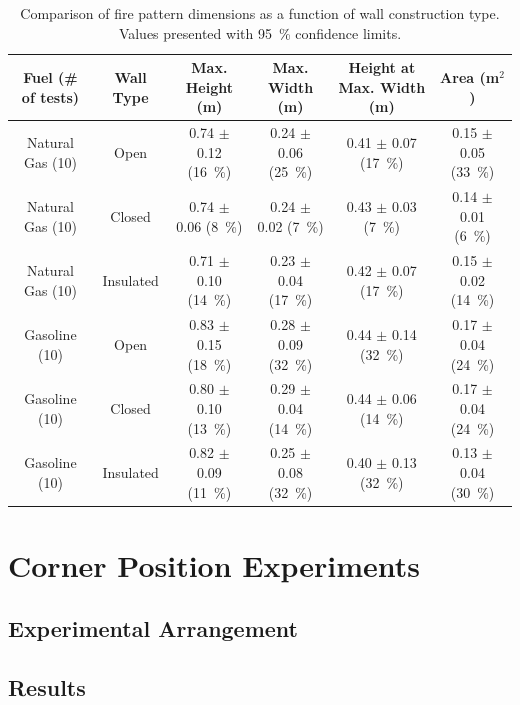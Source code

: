 \documentclass[twoside]{uocthesis}
\begin{document}
\begin{table}
	\centering
	\begin{tabular}{|c|c|c|c|c|c|}
	\hline
	Fuel (\# of tests)      &   Wall Type   &   Max. Height (m)	         & Max. Width (m)               &  Height at Max. Width (m) &  Area (m$^2$)  \\ \hline
		Natural Gas (10)    &   Open 		& 0.74 	$\pm$ 0.12 (16~\%)   &	0.24 $\pm$ 0.06 (25~\%) 	& 0.41 $\pm$ 0.07 (17~\%)	& 0.15 $\pm$ 0.05 (33~\%) 	\\
		Natural Gas (10)    &   Closed 		& 0.74	$\pm$ 0.06 (8~\%)    &	0.24 $\pm$ 0.02 (7~\%) 		& 0.43 $\pm$ 0.03 (7~\%)  	& 0.14 $\pm$ 0.01 (6~\%) 	\\
		Natural Gas (10)    &   Insulated 	& 0.71	$\pm$ 0.10 (14~\%)   &	0.23 $\pm$ 0.04 (17~\%) 	& 0.42 $\pm$ 0.07 (17~\%) 	& 0.15 $\pm$ 0.02 (14~\%)  	\\
		Gasoline (10)       &   Open    	& 0.83	$\pm$ 0.15 (18~\%)   &	0.28 $\pm$ 0.09 (32~\%) 	& 0.44 $\pm$ 0.14 (32~\%) 	& 0.17 $\pm$ 0.04 (24~\%)  	\\
		Gasoline (10)       &   Closed  	& 0.80	$\pm$ 0.10 (13~\%)   &	0.29 $\pm$ 0.04 (14~\%) 	& 0.44 $\pm$ 0.06 (14~\%) 	& 0.17 $\pm$ 0.04 (24~\%)  	\\
		Gasoline (10)       &   Insulated	& 0.82 	$\pm$ 0.09 (11~\%)   &	0.25 $\pm$ 0.08 (32~\%) 	& 0.40 $\pm$ 0.13 (32~\%) 	& 0.13 $\pm$ 0.04 (30~\%)  	\\
		\hline
	\end{tabular}
	\caption[Comparison of fire pattern dimensions as a function of wall construction type]{Comparison of fire pattern dimensions as a function of wall construction type. Values presented with 95~\% confidence limits.}
	\label{tab:Fire_Pattern_Dimensions_Wall_Construction}
\end{table}


\section{Corner Position Experiments}

\subsection{Experimental Arrangement}

\subsection{Results}
\end{document}
